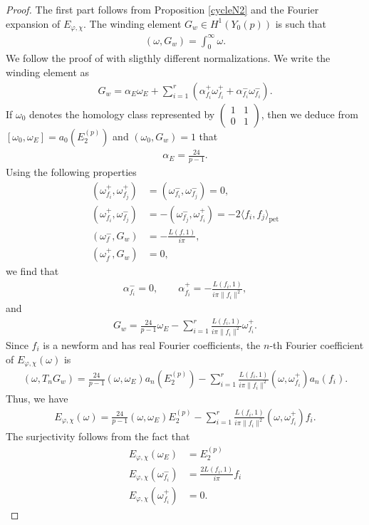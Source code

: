 \documentclass[a4paper,11pt]{amsart} %
\newcommand{\8}{\infty}
\newcommand{\pet}{\mathrm{pet}}
\theoremstyle{mytheoremstyle}
\theoremstyle{remark}
\numberwithin{equation}{section}
\begin{document}
\begin{proof} The first part follows from Proposition \ref{cycleN2} and the Fourier expansion of $E_{\varphi, \chi}$. The winding element $G_w \in H^1(Y_0(p))$ is such that
\begin{align}
    ( \omega, G_w )=\int_{0}^\8 \omega.
\end{align}
We follow the proof of \cite[Lemma.~3.4]{dpv} with sligthly different normalizations. We write the winding element as 
\begin{align}
G_w=\alpha_E \omega_E+\sum_{i=1}^r (\alpha_{f_i}^+\omega_{f_i}^++\alpha_{f_i}^-\omega_{f_i}^-).
\end{align}
If $\omega_0$ denotes the homology class represented by $\begin{pmatrix}
1 & 1 \\ 0 & 1
\end{pmatrix}$, then we deduce from $[ \omega_0, \omega_E ]=a_0(E_2^{(p)})$ and $( \omega_0, G_w )=1$ that
\begin{align}
\alpha_E=\frac{24}{p-1}.
\end{align}
Using the following properties
\begin{align}\label{properties pairing}
(\omega_{f_i}^+,\omega_{f_j}^+ )&=( \omega_{f_i}^-,\omega_{f_j}^- )=0, \nonumber \\
( \omega_{f_i}^+,\omega_{f_j}^- )&=-( \omega_{f_j}^-,\omega_{f_i}^+ )=-2 \langle f_i, f_j \rangle_\pet \nonumber \\
( \omega_{f}^-,G_w )&=-\frac{L(f,1)}{i\pi},  \\
( \omega_{f}^+,G_w )&=0,
\end{align}
we find that
\begin{align}
\alpha_{f_i}^-=0, \qquad \alpha_{f_i}^+=-\frac{L(f_i,1)}{i\pi\lVert f_i \rVert^2},
\end{align}
and
\begin{align}
    G_w= \frac{24}{p-1} \omega_E-\sum_{i=1}^r \frac{L(f_i,1)}{i\pi\lVert f_i \rVert^2} \omega_{f_i}^+.
\end{align}
Since $f_i$ is a newform and has real Fourier coefficients, the $n$-th Fourier coefficient of $E_{\varphi, \chi}(\omega)$ is
\begin{align}
 ( \omega, T_n G_w ) = \frac{24}{p-1} ( \omega , \omega_E ) a_n(E_2^{(p)})- \sum_{i=1}^r \frac{L(f_i,1)}{i\pi\lVert f_i \rVert^2} ( \omega ,\omega_{f_i}^+ ) a_n(f_i).
\end{align}
Thus, we have
\begin{align}
    E_{\varphi, \chi}(\omega) = \frac{24}{p-1} ( \omega , \omega_E ) E_2^{(p)}- \sum_{i=1}^r \frac{L(f_i,1)}{i\pi\lVert f_i \rVert^2}(\omega ,\omega_{f_i}^+ )f_i.
\end{align}
The surjectivity follows from the fact that 
\begin{align}
E_{\varphi, \chi}(\omega_E)& =E_{2}^{(p)} \nonumber \\
E_{\varphi, \chi}(\omega_{f_i}^-)& =\frac{2L(f_i,1)}{i\pi}f_i  \\
E_{\varphi, \chi}(\omega_{f_i}^+)& =0. \nonumber
\end{align}


\end{proof}
\end{document}
